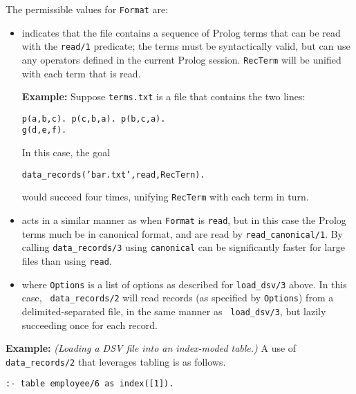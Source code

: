 \begin{description}
The permissible values for {\tt Format} are:
\begin{itemize}

\item[{\tt read}] indicates that the file contains a sequence of
  Prolog terms that can be read with the {\tt read/1} predicate; the
  terms must be syntactically valid, but can use any operators defined
  in the current Prolog session.  {\tt RecTerm} will be unified with
  each term that is read.

  {\bf Example:} Suppose {\tt terms.txt} is a file that contains the
  two lines:
\begin{verbatim}
p(a,b,c). p(c,b,a). p(b,c,a).
g(d,e,f).
\end{verbatim}
In this case, the goal

{\tt data\_records('bar.txt',read,RecTern).}

\noindent
would succeed four times, unifying {\tt RecTerm} with each term in
turn.

\item[{\tt canonical}] acts in a similar manner as when {\tt Format}
  is {\tt read}, but in this case the Prolog terms much be in
  canonical format, and are read by {\tt read\_canonical/1}.  By
  calling {\tt data\_records/3} using {\tt canonical} can be
  significantly faster for large files than using {\tt read}.


\item[{\tt dsv(Options)}] where {\tt Options} is a list of options as
  described for {\tt load\_dsv/3} above.  In this case, {\tt
    data\_records/2} will read records (as specified by {\tt Options})
  from a delimited-separated file, in the same manner as {\tt
    load\_dsv/3}, but lazily succeeding once for each record.

\end{itemize}
  
{\bf Example:} {\em (Loading a DSV file into an index-moded table.)}
A use of {\tt data\_records/2} that leverages tabling is as follows.
\begin{verbatim}
:- table employee/6 as index([1]).


\end{verbatim}
\end{description}
